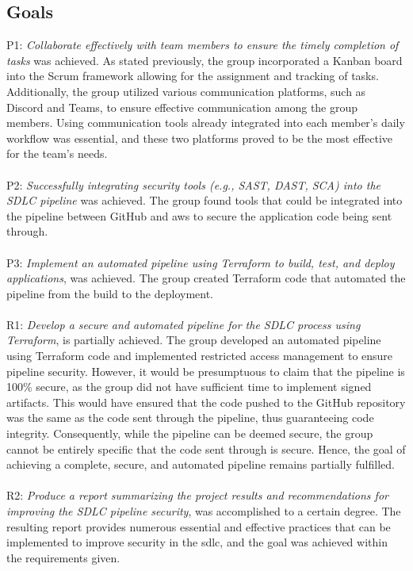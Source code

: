 \subsection{Goals}
P1: \textit{Collaborate effectively with team members to ensure the timely completion of tasks} was achieved. As stated previously, the group incorporated a Kanban board into the Scrum framework allowing for the assignment and tracking of tasks. Additionally, the group utilized various communication platforms, such as Discord and Teams, to ensure effective communication among the group members. Using communication tools already integrated into each member's daily workflow was essential, and these two platforms proved to be the most effective for the team's needs. 
\\~\\
P2: \textit{Successfully integrating security tools (e.g., SAST, DAST, SCA) into the SDLC pipeline} was achieved. The group found tools that could be integrated into the pipeline between GitHub and \acrshort{aws} to secure the application code being sent through.
\\~\\
P3: \textit{Implement an automated pipeline using Terraform to build, test, and deploy applications}, was achieved. The group created Terraform code that automated the pipeline from the build to the deployment. 
\\~\\
R1: \textit{Develop a secure and automated pipeline for the SDLC process using Terraform}, is partially achieved. The group developed an automated pipeline using Terraform code and implemented restricted access management to ensure pipeline security. However, it would be presumptuous to claim that the pipeline is 100\% secure, as the group did not have sufficient time to implement signed artifacts. This would have ensured that the code pushed to the GitHub repository was the same as the code sent through the pipeline, thus guaranteeing code integrity. Consequently, while the pipeline can be deemed secure, the group cannot be entirely specific that the code sent through is secure. Hence, the goal of achieving a complete, secure, and automated pipeline remains partially fulfilled. 
\\~\\
R2: \textit{Produce a report summarizing the project results and recommendations for improving the SDLC pipeline security}, was accomplished to a certain degree. The resulting report provides numerous essential and effective practices that can be implemented to improve security in the \acrshort{sdlc}, and the goal was achieved within the requirements given. 

